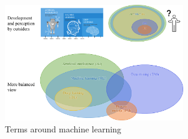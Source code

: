 \begin{figure}[H]
  \centering
  \includegraphics[width=0.7\textwidth]{assets/basics/confusion_terminology.png}
  \caption{Terms around machine learning}
  \label{fig:1_ml_terminology}
\end{figure}




